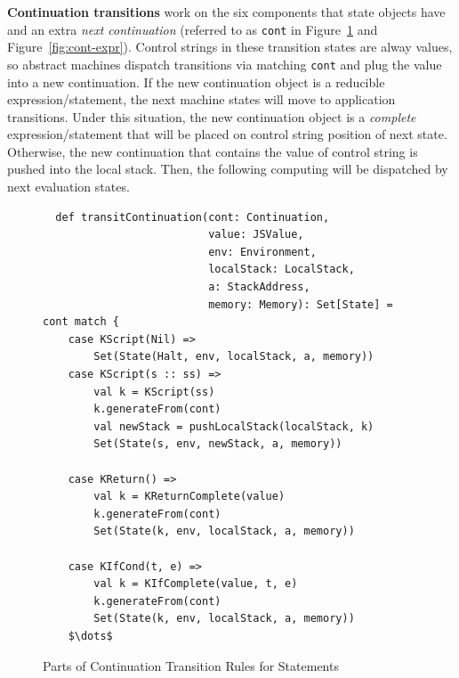 \documentclass{article}
\begin{document}
\textbf{Continuation transitions} work on the six components that state objects have and an extra \emph{next continuation} (referred to as \verb|cont| in Figure~\ref{fig:cont-stmt} and Figure~\ref{fig:cont-expr}).
Control strings in these transition states are alway values, so abstract machines dispatch transitions via matching \verb|cont| and plug the value into a new continuation.
If the new continuation object is a reducible expression/statement, the next machine states will move to application transitions.
Under this situation, the new continuation object is a \emph{complete} expression/statement that will be placed on control string position of next state.
Otherwise, the new continuation that contains the value of control string is pushed into the local stack.
Then, the following computing will be dispatched by next evaluation states.

\begin{figure}
\lstset{language=Scala, mathescape}
\begin{lstlisting}
  def transitContinuation(cont: Continuation,
                          value: JSValue,
                          env: Environment,
                          localStack: LocalStack,
                          a: StackAddress,
                          memory: Memory): Set[State] = cont match {
    case KScript(Nil) =>
        Set(State(Halt, env, localStack, a, memory))
    case KScript(s :: ss) =>
        val k = KScript(ss)
        k.generateFrom(cont)
        val newStack = pushLocalStack(localStack, k)
        Set(State(s, env, newStack, a, memory))

    case KReturn() =>
        val k = KReturnComplete(value)
        k.generateFrom(cont)
        Set(State(k, env, localStack, a, memory))

    case KIfCond(t, e) =>
        val k = KIfComplete(value, t, e)
        k.generateFrom(cont)
        Set(State(k, env, localStack, a, memory))
    $\dots$
\end{lstlisting}
\caption{Parts of Continuation Transition Rules for Statements}
\label{fig:cont-stmt}
\end{figure}
\end{document}
